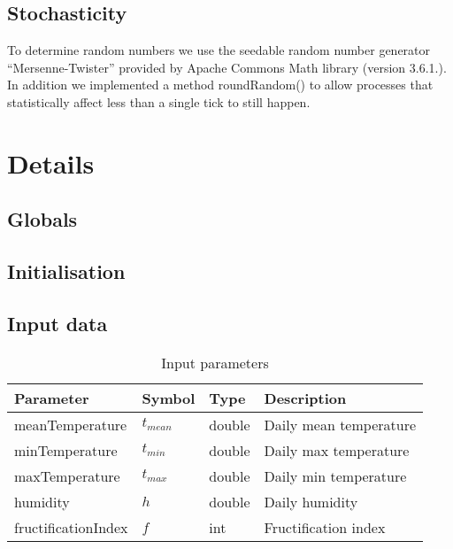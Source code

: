 \documentclass[a4paper, 11pt]{scrartcl}
\begin{document}
\subsection{Stochasticity}
To determine random numbers we use the seedable random number generator ``Mersenne-Twister'' provided by Apache Commons Math library
(version 3.6.1.). In addition we implemented a method roundRandom() to allow processes that statistically affect less than
a single tick to still happen.


\section{Details}

\subsection{Globals}

\subsection{Initialisation}

\subsection{Input data}


\begin{table}[h!]
\caption{Input parameters}
\label{input_parameters}
\begin{tabularx}{\textwidth}{llll}
\toprule
\textbf{Parameter} & \textbf{Symbol} & \textbf{Type}     & \textbf{Description}       \\
\midrule
meanTemperature    & $t_{mean}$      & double            & Daily mean temperature     \\
minTemperature     & $t_{min}$       & double            & Daily max temperature      \\
maxTemperature     & $t_{max}$       & double            & Daily min temperature      \\
humidity           & $h$             & double            & Daily humidity             \\
\midrule
fructificationIndex & $f$            & int               & Fructification index       \\
\bottomrule
\end{tabularx}
\end{table}
\end{document}
